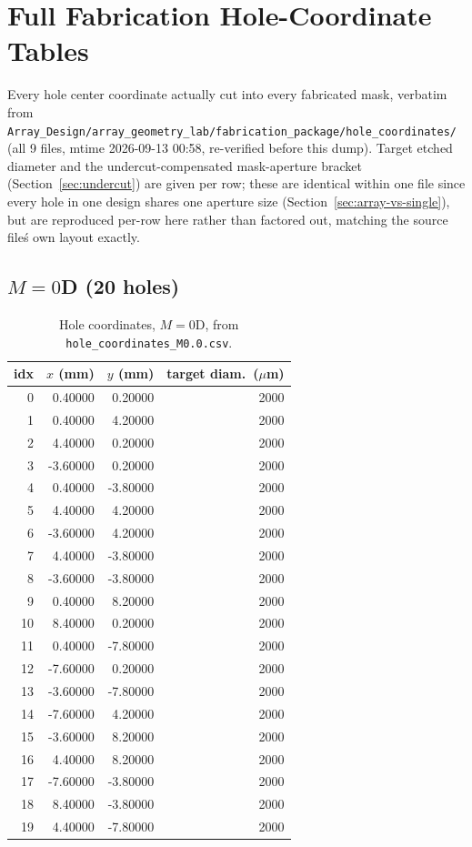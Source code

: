 \chapter{Full Fabrication Hole-Coordinate Tables}
\label{ch:full-hole-coords}
Every hole center coordinate actually cut into every fabricated mask, verbatim from
\texttt{Array\_Design/array\_geometry\_lab/fabrication\_package/hole\_coordinates/} (all 9 files, mtime 2026-09-13 00:58, re-verified before this dump). Target etched diameter and the undercut-compensated mask-aperture bracket (Section~\ref{sec:undercut}) are given per row; these are identical within one file since every hole in one design shares one aperture size (Section~\ref{sec:array-vs-single}), but are reproduced per-row here rather than factored out, matching the source file\'s own layout exactly.

\section{$M=0$D (20 holes)}
\begin{longtable}{rrrr}
\caption{Hole coordinates, $M=0$D, from \texttt{hole\_coordinates\_M0.0.csv}.}\\
\toprule
idx & $x$ (mm) & $y$ (mm) & target diam.\ ($\mu$m) \\
\midrule
\endhead
0 & 0.40000 & 0.20000 & 2000 \\
1 & 0.40000 & 4.20000 & 2000 \\
2 & 4.40000 & 0.20000 & 2000 \\
3 & -3.60000 & 0.20000 & 2000 \\
4 & 0.40000 & -3.80000 & 2000 \\
5 & 4.40000 & 4.20000 & 2000 \\
6 & -3.60000 & 4.20000 & 2000 \\
7 & 4.40000 & -3.80000 & 2000 \\
8 & -3.60000 & -3.80000 & 2000 \\
9 & 0.40000 & 8.20000 & 2000 \\
10 & 8.40000 & 0.20000 & 2000 \\
11 & 0.40000 & -7.80000 & 2000 \\
12 & -7.60000 & 0.20000 & 2000 \\
13 & -3.60000 & -7.80000 & 2000 \\
14 & -7.60000 & 4.20000 & 2000 \\
15 & -3.60000 & 8.20000 & 2000 \\
16 & 4.40000 & 8.20000 & 2000 \\
17 & -7.60000 & -3.80000 & 2000 \\
18 & 8.40000 & -3.80000 & 2000 \\
19 & 4.40000 & -7.80000 & 2000 \\
\bottomrule
\end{longtable}

